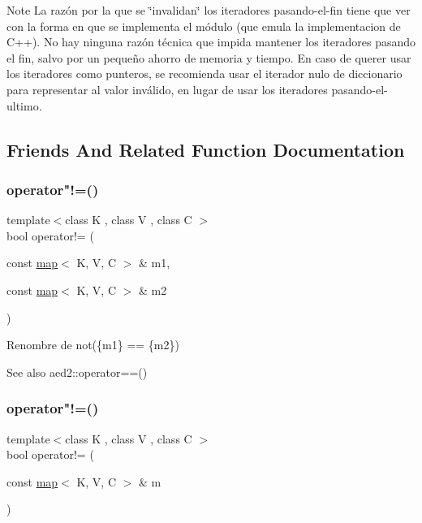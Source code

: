 \begin{DoxyNote}{Note}
La razón por la que se \char`\"{}invalidan\char`\"{} los iteradores pasando-\/el-\/fin tiene que ver con la forma en que se implementa el módulo (que emula la implementacion de C++). No hay ninguna razón técnica que impida mantener los iteradores pasando el fin, salvo por un pequeño ahorro de memoria y tiempo. En caso de querer usar los iteradores como punteros, se recomienda usar el iterador nulo de diccionario para representar al valor inválido, en lugar de usar los iteradores pasando-\/el-\/ultimo. 
\end{DoxyNote}


\subsection{Friends And Related Function Documentation}
\mbox{\label{classaed2_1_1map_abce0fa35c5b25fd67111c2e704616f09}} 
\subsubsection{\texorpdfstring{operator"!=()}{operator!=()}\hspace{0.1cm}{\footnotesize\ttfamily [1/2]}}
{\footnotesize\ttfamily template$<$class K , class V , class C $>$ \\
bool operator!= (\begin{DoxyParamCaption}\item[{const \hyperlink{classaed2_1_1map}{map}$<$ K, V, C $>$ \&}]{m1,  }\item[{const \hyperlink{classaed2_1_1map}{map}$<$ K, V, C $>$ \&}]{m2 }\end{DoxyParamCaption})\hspace{0.3cm}{\ttfamily [related]}}



Renombre de not(\{m1\} == \{m2\}) 

\begin{DoxySeeAlso}{See also}
aed2\+::operator==() 
\end{DoxySeeAlso}
\mbox{\label{classaed2_1_1map_a11627296a0eb71c87e69caa89fbd94eb}} 
\subsubsection{\texorpdfstring{operator"!=()}{operator!=()}\hspace{0.1cm}{\footnotesize\ttfamily [2/2]}}
{\footnotesize\ttfamily template$<$class K , class V , class C $>$ \\
bool operator!= (\begin{DoxyParamCaption}\item[{const \hyperlink{classaed2_1_1map}{map}$<$ K, V, C $>$ \&}]{m }\end{DoxyParamCaption})\hspace{0.3cm}{\ttfamily [related]}}



